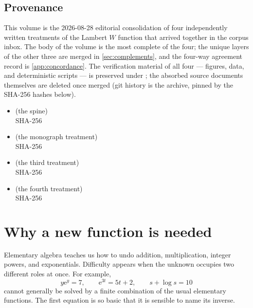 \documentclass[11pt]{article}
\theoremstyle{remark}
\newcommand{\ee}{\mathrm e}
\begin{document}
\subsection*{Provenance}
This volume is the 2026-08-28 editorial consolidation of four independently
written treatments of the Lambert $W$ function that arrived together in the
corpus inbox.  The body of the volume is the most complete of the four; the
unique layers of the other three are merged in
\cref{sec:complements}, and the four-way agreement record is
\cref{app:concordance}.  The verification material of all four --- figures,
data, and deterministic scripts --- is preserved under ; the
absorbed source documents themselves are deleted once merged (git history is
the archive, pinned by the SHA-256 hashes below).
\begin{itemize}
\item {} (the spine)\\
{\footnotesize SHA-256 }
\item {} (the monograph treatment)\\
{\footnotesize SHA-256 }
\item {} (the third treatment)\\
{\footnotesize SHA-256 }
\item {} (the fourth treatment)\\
{\footnotesize SHA-256 }
\end{itemize}

\tableofcontents
\clearpage

\section{Why a new function is needed}

Elementary algebra teaches us how to undo addition, multiplication, integer
powers, and exponentials.  Difficulty appears when the unknown occupies two
different roles at once.  For example,
\[
   y\ee^y=7,\qquad
   \ee^{3t}=5t+2,\qquad
   s+\log s=10
\]
cannot generally be solved by a finite combination of the usual elementary
functions.  The first equation is so basic that it is sensible to name its
inverse.
\end{document}
